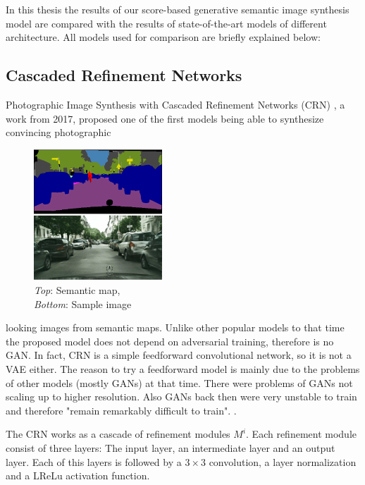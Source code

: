 In this thesis the results of our score-based generative semantic image synthesis model are compared with the results of state-of-the-art models of different architecture. All models used for comparison are briefly explained below:

\subsection{Cascaded Refinement Networks} \label{sec:3.2.1}
Photographic Image Synthesis with Cascaded Refinement Networks (CRN) \cite{crn}, a work from 2017, proposed one of the first models being able to synthesize convincing photographic
%
\begin{figure}
    \begin{center}
        \includegraphics[width=0.43\textwidth]{Chapters/figures/crn_example.PNG}
    \end{center}
    \caption[]{\textit{Top}: Semantic map, \\\textit{Bottom}: Sample image}
\end{figure}
%
looking images from semantic maps. Unlike other popular models to that time the proposed model does not depend on adversarial training, therefore is no GAN. In fact, CRN is a simple feedforward convolutional network, so it is not a VAE either. The reason to try a feedforward model is mainly due to the problems of other models (mostly GANs) at that time. There were problems of GANs not scaling up to higher resolution. Also GANs back then were very unstable to train and therefore "remain remarkably difficult to train".
\cite{crn}.

The CRN works as a cascade of refinement modules $M^i$. Each refinement module consist of three layers: The input layer, an intermediate layer and an output layer. Each of this layers is followed by a $3\times3$ convolution, a layer normalization and a LReLu activation function. 

